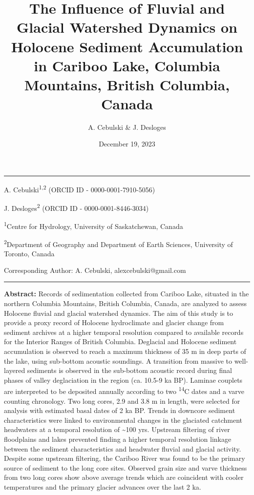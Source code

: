 \documentclass[
  letterpaper,
  DIV=11,
  numbers=noendperiod]{scrartcl}
\title{The Influence of Fluvial and Glacial Watershed Dynamics on
Holocene Sediment Accumulation in Cariboo Lake, Columbia Mountains,
British Columbia, Canada}
\author{A. Cebulski \& J. Desloges}
\date{December 19, 2023}
\begin{document}
\maketitle
\ifdefined\Shaded\renewenvironment{Shaded}{\begin{tcolorbox}[borderline west={3pt}{0pt}{shadecolor}, sharp corners, frame hidden, breakable, boxrule=0pt, interior hidden, enhanced]}{\end{tcolorbox}}\fi

\begin{center}\rule{0.5\linewidth}{0.5pt}\end{center}

A. Cebulski\textsuperscript{1,2} (ORCID ID - 0000-0001-7910-5056)

J. Desloges\textsuperscript{2} (ORCID ID - 0000-0001-8446-3034)

\textsuperscript{1}Centre for Hydrology, University of Saskatchewan,
Canada

\textsuperscript{2}Department of Geography and Department of Earth
Sciences, University of Toronto, Canada

Corresponding Author: A. Cebulski, alexcebulski@gmail.com

\begin{center}\rule{0.5\linewidth}{0.5pt}\end{center}

\pagebreak

\textbf{Abstract:} Records of sedimentation collected from Cariboo Lake,
situated in the northern Columbia Mountains, British Columbia, Canada,
are analyzed to assess Holocene fluvial and glacial watershed dynamics.
The aim of this study is to provide a proxy record of Holocene
hydroclimate and glacier change from sediment archives at a higher
temporal resolution compared to available records for the Interior
Ranges of British Columbia. Deglacial and Holocene sediment accumulation
is observed to reach a maximum thickness of 35 m in deep parts of the
lake, using sub-bottom acoustic soundings. A transition from massive to
well-layered sediments is observed in the sub-bottom acoustic record
during final phases of valley deglaciation in the region (ca. 10.5-9 ka
BP). Laminae couplets are interpreted to be deposited annually according
to two \textsuperscript{14}C dates and a varve counting chronology. Two
long cores, 2.9 and 3.8 m in length, were selected for analysis with
estimated basal dates of 2 ka BP. Trends in downcore sediment
characteristics were linked to environmental changes in the glaciated
catchment headwaters at a temporal resolution of \textasciitilde100 yrs.
Upstream filtering of river floodplains and lakes prevented finding a
higher temporal resolution linkage between the sediment characteristics
and headwater fluvial and glacial activity. Despite some upstream
filtering, the Cariboo River was found to be the primary source of
sediment to the long core sites. Observed grain size and varve thickness
from two long cores show above average trends which are coincident with
cooler temperatures and the primary glacier advances over the last 2 ka.
\end{document}
